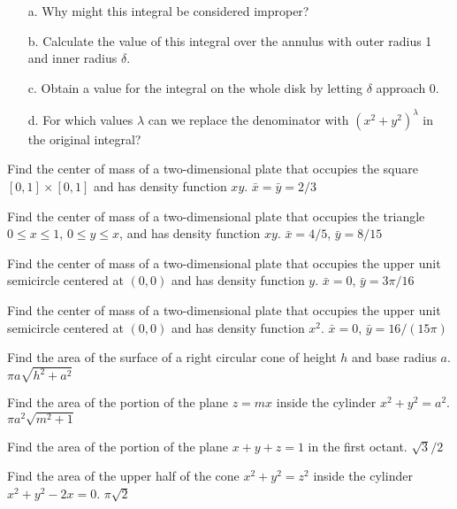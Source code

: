 \begin{multicols}{2}
\begin{itemize}

\item[a.] Why might this integral be considered improper?

\item[b.] Calculate the value of this integral over the annulus with outer
    radius 1 and inner radius $\delta$.

\item[c.] Obtain a value for the integral on the whole disk by letting
    $\delta$ approach 0.

\item[d.] For which values $\lambda$ can we replace the denominator with
    $(x^2+y^2)^\lambda$ in the original integral?

\end{itemize}






\problem Find the center of mass of a two-dimensional plate  %
that occupies the square $[0,1]\times[0,1]$
and has density
function $xy$.
\answer
$\bar x=\bar y=2/3$
\endanswer

\problem Find the center of mass of a two-dimensional plate  %
that occupies the triangle $0\le x\le1$, $0\le y\le x$,
and has density
function $xy$.
\answer
$\bar x=4/5$, $\bar y=8/15$
\endanswer

\problem Find the center of mass of a two-dimensional plate  %
that occupies the upper unit semicircle centered at $(0,0)$
and has density
function $y$.
\answer
$\bar x=0$, $\bar y=3\pi/16$
\endanswer

\problem Find the center of mass of a two-dimensional plate  %
that occupies the upper unit semicircle centered at $(0,0)$
and has density
function $x^2$.
\answer
$\bar x=0$, $\bar y=16/(15\pi)$
\endanswer






\problem Find the area of the surface of a right circular cone of %
height $h$ and base radius $a$.
\answer
$\pi a\sqrt{h^2+a^2}$
\endanswer

\problem Find the area of the portion of the plane $z=mx$ inside the %
cylinder $x^2+y^2=a^2$.
\answer
$\pi a^2\sqrt{m^2+1}$
\endanswer

\problem Find the area of the portion of the plane $x+y+z=1$ in the %
first octant.
\answer
$\sqrt3/2$
\endanswer

\problem Find the area of the upper half of the cone %
$x^2+y^2=z^2$ inside the cylinder $x^2+y^2-2x = 0$.
\answer
$\pi\sqrt2$
\endanswer


\end{multicols}
